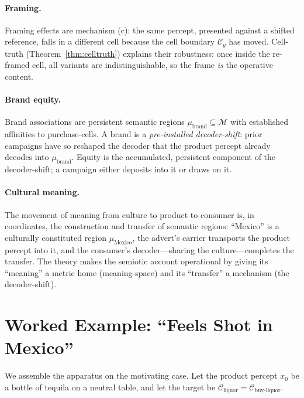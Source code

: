 \documentclass[twocolumn,11pt,a4paper]{article}
\theoremstyle{adv}
\theoremstyle{definition}
\theoremstyle{remark}
\newcommand{\Cell}{\mathcal{C}}        %
\newcommand{\Mean}{\mathcal{M}}        %
\begin{document}
\paragraph{Framing.}
Framing effects \citep{tversky1981} are mechanism (c): the same percept,
presented against a shifted reference, falls in a different cell because
the cell boundary $\Cell_y$ has moved. Cell-truth
(Theorem~\ref{thm:celltruth}) explains their robustness: once inside the
re-framed cell, all variants are indistinguishable, so the frame
\emph{is} the operative content.

\paragraph{Brand equity.}
Brand associations \citep{aaker1991,keller1993} are persistent semantic
regions $\mu_{\text{brand}}\subseteq\Mean$ with established affinities to
purchase-cells. A brand is a \emph{pre-installed decoder-shift}: prior
campaigns have so reshaped the decoder that the product percept already
decodes into $\mu_{\text{brand}}$. Equity is the accumulated, persistent
component of the decoder-shift; a campaign either deposits into it or draws
on it.

\paragraph{Cultural meaning.}
The movement of meaning from culture to product to consumer
\citep{mccracken1988,mick1986,barthes1977} is, in coordinates, the
construction and transfer of semantic regions: ``Mexico'' is a culturally
constituted region $\mu_{\text{Mexico}}$, the advert's carrier transports
the product percept into it, and the consumer's decoder---sharing the
culture---completes the transfer. The theory makes the semiotic account
operational by giving its ``meaning'' a metric home (meaning-space) and its
``transfer'' a mechanism (the decoder-shift).

\section{Worked Example: ``Feels Shot in Mexico''}
\label{sec:example}

We assemble the apparatus on the motivating case. Let the product percept
$x_0$ be a bottle of tequila on a neutral table, and let the target be
$\Cell_{\text{liquor}}=\Cell_{\text{buy-liquor}}$.
\end{document}
